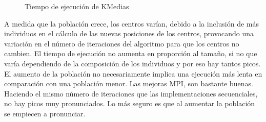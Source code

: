 		\begin{figure}[!h]
		\centering
		\caption{Tiempo de ejecución de KMedias}
		\end{figure}
		
		
		A medida que la población crece, los centros varían, debido a la inclusión de más individuos en el cálculo de las nuevas posiciones de los centros, provocando una variación en el número de iteraciones del algoritmo para que los centros no cambien. 
		El tiempo de ejecución no aumenta en proporción al tamaño, si no que varía dependiendo de la composición de los individuos y por eso hay tantos picos. El aumento de la población no necesariamente implica una ejecución más lenta en comparación con una población menor.
		Las mejoras MPI, son bastante buenas. Haciendo el mismo número de iteraciones que las implementaciones secuenciales, no hay picos muy pronunciados. Lo más seguro es que al aumentar la población se empiecen a pronunciar.
		
		
		
		
		
